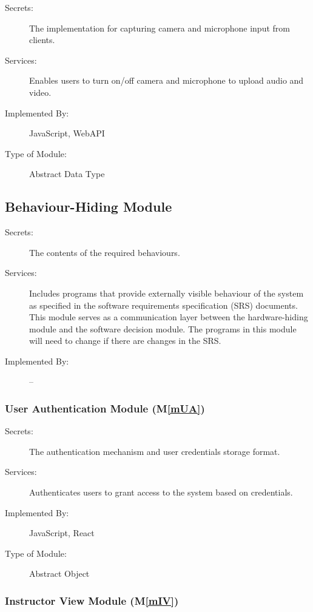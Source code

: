 \documentclass[12pt, titlepage]{article}
\newcommand{\mref}[1]{M\ref{#1}}
\begin{document}
\begin{description}
\item[Secrets:]The implementation for capturing camera and microphone input from clients.
\item[Services:]Enables users to turn on/off camera and microphone to upload audio and video.
\item[Implemented By:] JavaScript, WebAPI
\item[Type of Module:] Abstract Data Type
\end{description}

\subsection{Behaviour-Hiding Module}

\begin{description}
\item[Secrets:]The contents of the required behaviours.
\item[Services:]Includes programs that provide externally visible behaviour of
  the system as specified in the software requirements specification (SRS)
  documents. This module serves as a communication layer between the
  hardware-hiding module and the software decision module. The programs in this
  module will need to change if there are changes in the SRS.
\item[Implemented By:] --
\end{description}

\subsubsection{User Authentication Module (\mref{mUA})}

\begin{description}
\item[Secrets:] The authentication mechanism and user credentials storage format.
\item[Services:] Authenticates users to grant access to the system based on credentials.
\item[Implemented By:] JavaScript, React
\item[Type of Module:] Abstract Object
\end{description}

\subsubsection{Instructor View Module (\mref{mIV})}
\end{document}
